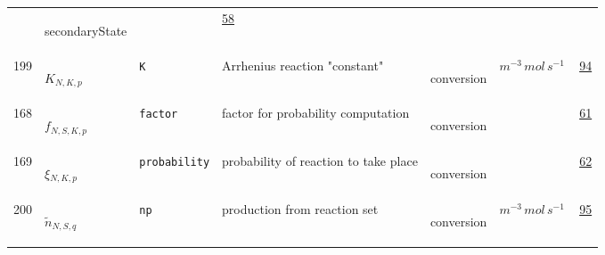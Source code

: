 \begin{longtable}{|p{1cm}|p{2.5cm}|p{4.5cm}|p{8cm}|p{3.0cm}|p{3cm}|p{1cm}|}
             & \begin{lay}secondaryState \end{lay}
             & $  $
             &                 \hyperlink{"e:58"}{ 58 }
                 \\
            199
             & \hypertarget{"v:199"}{ $ {K}{_{N, K, p}} $}
             & \verb|K|
             & Arrhenius reaction "constant"
             & \begin{lay}conversion \end{lay}
             & $ m^{-3} \,mol \,s^{-1} \, $
             &                 \hyperlink{"e:94"}{ 94 }
                 \\
            168
             & \hypertarget{"v:168"}{ $ {f}{_{N, S, K, p}} $}
             & \verb|factor|
             & factor for probability computation
             & \begin{lay}conversion \end{lay}
             & $  $
             &                 \hyperlink{"e:61"}{ 61 }
                 \\
            169
             & \hypertarget{"v:169"}{ $ {\xi}{_{N, K, p}} $}
             & \verb|probability|
             & probability of reaction to take place
             & \begin{lay}conversion \end{lay}
             & $  $
             &                 \hyperlink{"e:62"}{ 62 }
                 \\
            200
             & \hypertarget{"v:200"}{ $ {{\tilde{n}}}{_{N, S, q}} $}
             & \verb|np|
             & production from reaction set
             & \begin{lay}conversion \end{lay}
             & $ m^{-3} \,mol \,s^{-1} \, $
             &                 \hyperlink{"e:95"}{ 95 }
                 \\
    \end{longtable}